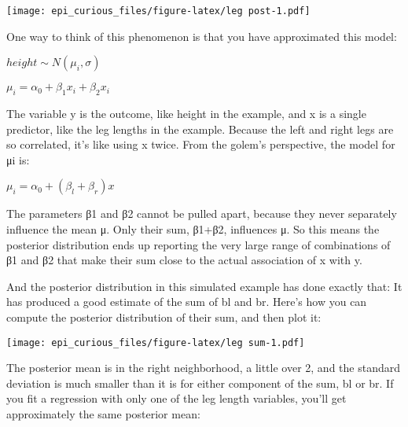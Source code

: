 \documentclass[
]{article}
\newenvironment{Shaded}{\begin{snugshade}}{\end{snugshade}}
\newcommand{\DataTypeTok}[1]{\textcolor[rgb]{0.13,0.29,0.53}{#1}}
\newcommand{\DecValTok}[1]{\textcolor[rgb]{0.00,0.00,0.81}{#1}}
\newcommand{\KeywordTok}[1]{\textcolor[rgb]{0.13,0.29,0.53}{\textbf{#1}}}
\newcommand{\NormalTok}[1]{#1}
\newcommand{\OperatorTok}[1]{\textcolor[rgb]{0.81,0.36,0.00}{\textbf{#1}}}
\newcommand{\StringTok}[1]{\textcolor[rgb]{0.31,0.60,0.02}{#1}}
\begin{document}
\texttt{[image: epi\_curious\_files/figure-latex/leg post-1.pdf]}

One way to think of this phenomenon is that you have approximated this
model:

\(height \sim N(\mu_i, \sigma)\)

\(\mu_i = \alpha_{0} + \beta_{1} x_{i}+ \beta_{2} x_{i}\)

The variable y is the outcome, like height in the example, and x is a
single predictor, like the leg lengths in the example. Because the left
and right legs are so correlated, it's like using x twice. From the
golem's perspective, the model for μi is:

\(\mu_i = \alpha_{0} + (\beta_{l} + \beta_{r}) x\)

The parameters β1 and β2 cannot be pulled apart, because they never
separately influence the mean μ. Only their sum, β1+β2, influences μ. So
this means the posterior distribution ends up reporting the very large
range of combinations of β1 and β2 that make their sum close to the
actual association of x with y.

And the posterior distribution in this simulated example has done
exactly that: It has produced a good estimate of the sum of bl and br.
Here's how you can compute the posterior distribution of their sum, and
then plot it:

\begin{Shaded}
\end{Shaded}

\texttt{[image: epi\_curious\_files/figure-latex/leg sum-1.pdf]}

The posterior mean is in the right neighborhood, a little over 2, and
the standard deviation is much smaller than it is for either component
of the sum, bl or br. If you fit a regression with only one of the leg
length variables, you'll get approximately the same posterior mean:
\end{document}
